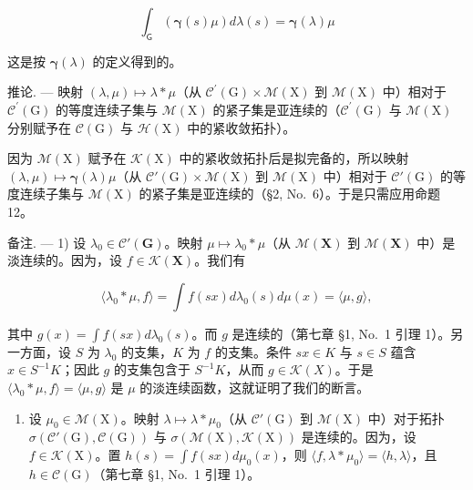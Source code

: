 \[
\int_ {\mathsf {G}} \left(\pmb {\gamma} (s) \mu\right) d \lambda (s) = \pmb {\gamma} (\lambda) \mu
\]

这是按 \(\pmb{\gamma}(\lambda)\) 的定义得到的。

推论. --- 映射 \((\lambda,\mu)\mapsto\lambda*\mu\)（从 \(\mathcal{C}^{\prime}(\mathrm{G})\times\mathcal{M}(\mathrm{X})\) 到 \(\mathcal{M}(\mathrm{X})\) 中）相对于 \(\mathcal{C}^{\prime}(\mathrm{G})\) 的等度连续子集与 \(\mathcal{M}(\mathrm{X})\) 的紧子集是亚连续的（\(\mathcal{C}^{\prime}(\mathrm{G})\) 与 \(\mathcal{M}(\mathrm{X})\) 分别赋予在 \(\mathcal{C}(\mathrm{G})\) 与 \(\mathcal{H}(\mathrm{X})\) 中的紧收敛拓扑）。

因为 \(\mathcal{M}(\mathrm{X})\) 赋予在 \(\mathcal{K}(\mathrm{X})\) 中的紧收敛拓扑后是拟完备的，所以映射 \((\lambda, \mu) \mapsto \pmb{\gamma}(\lambda)\mu\)（从 \(\mathcal{C}'(\mathrm{G}) \times \mathcal{M}(\mathrm{X})\) 到 \(\mathcal{M}(\mathrm{X})\) 中）相对于 \(\mathcal{C}'(\mathrm{G})\) 的等度连续子集与 \(\mathcal{M}(\mathrm{X})\) 的紧子集是亚连续的（§2, No.~6）。于是只需应用命题 12。

备注. --- 1) 设 \(\lambda_0 \in \mathcal{C}'(\mathbf{G})\)。映射 \(\mu \mapsto \lambda_0 * \mu\)（从 \(\mathcal{M}(\mathbf{X})\) 到 \(\mathcal{M}(\mathbf{X})\) 中）是淡连续的。因为，设 \(f \in \mathcal{K}(\mathbf{X})\)。我们有

\[
\langle \lambda_ {0} * \mu , f \rangle = \int f (s x) d \lambda_ {0} (s) d \mu (x) = \langle \mu , g \rangle ,
\]

其中 \(g(x) = \int f(sx) d\lambda_0(s)\)。而 \(g\) 是连续的（第七章 §1, No.~1 引理 1）。另一方面，设 \(S\) 为 \(\lambda_0\) 的支集，\(K\) 为 \(f\) 的支集。条件 \(sx \in K\) 与 \(s \in S\) 蕴含 \(x \in S^{-1}K\)；因此 \(g\) 的支集包含于 \(S^{-1}K\)，从而 \(g \in \mathcal{K}(X)\)。于是 \(\langle \lambda_0 * \mu, f \rangle = \langle \mu, g \rangle\) 是 \(\mu\) 的淡连续函数，这就证明了我们的断言。

\begin{enumerate}
\def\labelenumi{\arabic{enumi})}
\setcounter{enumi}{1}
\tightlist
\item
  设 \(\mu_0 \in \mathcal{M}(\mathrm{X})\)。映射 \(\lambda \mapsto \lambda * \mu_0\)（从 \(\mathcal{C}'(\mathrm{G})\) 到 \(\mathcal{M}(\mathrm{X})\) 中）对于拓扑 \(\sigma(\mathcal{C}'(\mathrm{G}), \mathcal{C}(\mathrm{G}))\) 与 \(\sigma(\mathcal{M}(\mathrm{X}), \mathcal{K}(\mathrm{X}))\) 是连续的。因为，设 \(f \in \mathcal{K}(\mathrm{X})\)。置 \(h(s) = \int f(sx) d\mu_0(x)\)，则 \(\langle f, \lambda * \mu_0 \rangle = \langle h, \lambda \rangle\)，且 \(h \in \mathcal{C}(\mathrm{G})\)（第七章 §1, No.~1 引理 1）。
\end{enumerate}

